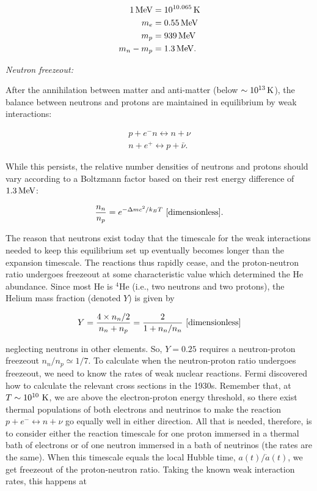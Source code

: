 \documentclass[a4paper,11pt]{article}
\begin{document}
\begin{align*}
    1\,{\rm MeV} &= 10^{10.065}\,{\rm K} \\
    m_e &= 0.55\,{\rm MeV} \\
    m_p &= 939\,{\rm MeV} \\
    m_n-m_p &= 1.3\,{\rm MeV}.
\end{align*}

{\noindent}\textit{Neutron freezeout:}

{\noindent}After the annihilation between matter and anti-matter (below $\sim10^{13}\,{\rm K}$), the balance between neutrons and protons are maintained in equilibrium by weak interactions:

\begin{align*}
    p + e^-n \leftrightarrow n + \nu \\
    n + e^+ \leftrightarrow p + \bar{\nu}.
\end{align*}

{\noindent}While this persists, the relative number densities of neutrons and protons should vary according to a Boltzmann factor based on their rest energy difference of $1.3\,{\rm MeV}$:

\begin{align*}
    \frac{n_n}{n_p} = e^{-\Delta mc^2/k_BT} ~ [{\rm dimensionless}].
\end{align*}

{\noindent}The reason that neutrons exist today that the timescale for the weak interactions needed to keep this equilibrium set up eventually becomes longer than the expansion timescale. The reactions thus rapidly cease, and the proton-neutron ratio undergoes freezeout at some characteristic value which determined the He abundance. Since most He is $^4$He (i.e., two neutrons and two protons), the Helium mass fraction (denoted $Y$) is given by

\begin{align*}
    Y = \frac{4\times n_n/2}{n_n + n_p}  = \frac{2}{1 + n_n/n_n} ~ [{\rm dimensionless}]
\end{align*}

{\noindent}neglecting neutrons in other elements. So, $Y=0.25$ requires a neutron-proton freezeout $n_n/n_p\simeq1/7$. To calculate when the neutron-proton ratio undergoes freezeout, we need to know the rates of weak nuclear reactions. Fermi discovered how to calculate the relevant cross sections in the 1930s. Remember that, at $T\sim10^{10}~{\rm K}$, we are above the electron-proton energy threshold, so there exist thermal populations of both electrons and neutrinos to make the reaction $p+e^- \leftrightarrow n+\nu$ go equally well in either direction. All that is needed, therefore, is to consider either the reaction timescale for one proton immersed in a thermal bath of electrons or of one neutron immersed in a bath of neutrinos (the rates are the same). When this timescale equals the local Hubble time, $a(t)/\dot{a}(t)$, we get freezeout of the proton-neutron ratio. Taking the known weak interaction rates, this happens at
\end{document}
